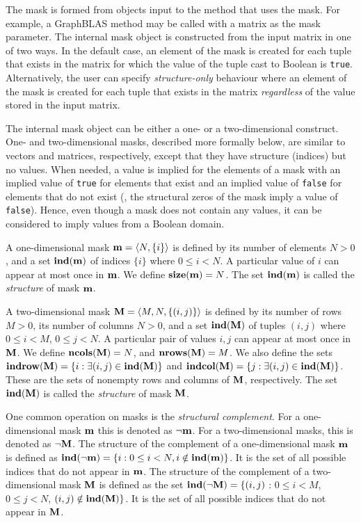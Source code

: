 The mask is formed from objects input to the method that uses 
the mask.  For example, a GraphBLAS method may be called with a matrix as the mask
parameter.   The internal mask object is constructed from the input matrix in one
of two ways.  In the default case, an element of the mask is created for each 
tuple that exists in the matrix for which the value of the tuple cast to Boolean 
is {\tt true}.  Alternatively, the user can specify {\em structure-only} behaviour where
an element of the mask is created for each tuple that exists in the matrix 
{\em regardless} of the value stored in the input matrix.

The internal mask object can be either a one- or a two-dimensional construct.  One- and
two-dimensional masks, described more formally below, are similar to
vectors and matrices, respectively, except that they have structure
(indices) but no values.  When needed, a value is implied for the elements of a 
mask with an implied value of {\tt true} for elements that exist 
and an implied value of {\tt false} for elements that do not exist (\ie,
the structural zeros of the mask imply a value of {\tt false}).
Hence, even though a mask does not contain any values, it can be 
considered to imply values from a Boolean domain.

A one-dimensional mask ${\bf m} = \langle N, \{ i \} \rangle$ is
defined by its number of elements $N>0$, and a set $\mathbf{ind}({\bf m})$
of indices $\{ i \}$ where $0 \leq i < N$.  A particular value of $i$ can
appear at most once in ${\bf m}$. We define $\mathbf{size}({\bf m})
= N$. The set $\mathbf{ind}({\bf m})$ is called the \emph{structure} of mask ${\bf m}$.

A two-dimensional mask ${\bf M} = \langle M, N, \{ (i,j) \}
\rangle$ is defined by its number of rows $M>0$, its number of
columns $N>0$, and a set $\mathbf{ind}({\bf M})$ of tuples $(i,j)$
where $0 \leq i < M$, $0 \leq j < N$.   A particular pair of values
$i,j$ can appear at most once in ${\bf M}$.  We define
$\mathbf{ncols}({\bf M}) = N$, and $\mathbf{nrows}({\bf M}) = M$.
We also define the sets ${\bf indrow({\bf M})} = \{ i : \exists
(i,j) \in \mathbf{ind}({\bf M}) \}$ and ${\bf indcol({\bf M})}
= \{ j : \exists (i,j) \in \mathbf{ind}({\bf M}) \}$.  These are
the sets of nonempty rows and columns of ${\bf M}$, respectively.
The set $\mathbf{ind}({\bf M})$ is called the \emph{structure} of mask ${\bf M}$.

One common operation on masks is the \emph{structural complement}.
For a one-dimensional mask ${\bf m}$ this is denoted as
$\neg{\bf m}$. For a two-dimensional masks, this is denoted as
$\neg{\bf M}$.  The structure of the complement of a one-dimensional
mask ${\bf m}$ is defined as $\mathbf{ind}(\neg{\bf m}) = \{i : 0
\leq i < N, i \notin \mathbf{ind}({\bf m}) \}$.  It is the set of all
possible indices that do not appear in ${\bf m}$.  The structure
of the complement of a two-dimensional mask ${\bf M}$ is defined as the set
$\mathbf{ind}(\neg{\bf M}) = \{(i,j)$ : $0 \leq i < M$, $0 \leq j < N$,
$(i,j) \notin \mathbf{ind}({\bf M}) \}$.  It is the set of all possible
indices that do not appear in ${\bf M}$.

